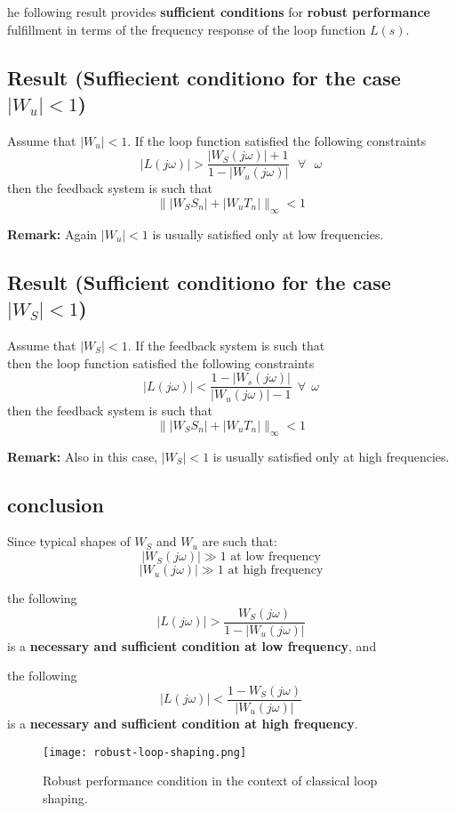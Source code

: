 he following result provides \textbf{sufficient conditions} for \textbf{robust performance} fulfillment in terms of the frequency response of the loop function $L(s)$.\\


\subsection{Result (Suffiecient conditiono for the case $|W_u|< 1$)}

Assume that $|W_u| < 1$. If the loop function satisfied the following constraints
\[
|L(j\omega)|> \frac{|W_S(j\omega)|+1}{1-|W_u(j\omega)|} \:\:\: \forall \:\:\: \omega
\]
then the feedback system is such that 
\[
\||W_SS_n|+|W_uT_n|\|_\infty < 1
\]

\textbf{Remark:} Again $|W_u| < 1$ is usually satisfied only at low frequencies.\\


\subsection{Result (Sufficient conditiono for the case $|W_S|< 1$)}
Assume that $|W_S|<1$. If the feedback system is such that \\
then the loop function satisfied the following constraints
\[
|L(j\omega)| < \frac{1-|W_s(j\omega)|}{|W_u(j\omega)|-1} \:\:\forall \:\: \omega
\]
then the feedback system is such that 
\[
\||W_SS_n|+|W_uT_n|\|_\infty < 1
\]

\textbf{Remark:} Also in this case, $|W_S| < 1$ is usually satisfied only at high frequencies.\\

\subsection{conclusion}
Since typical shapes of $W_S$ and $W_u$ are such that:
\[
|W_S(j\omega)| \gg 1  \text{  at low frequency}
\]
\[
|W_u(j\omega)| \gg 1  \text{  at high frequency}
\]

the following 
\[
|L(j\omega)| > \frac{W_S(j\omega)}{1- |W_u(j\omega)|}
\]
is a \textbf{necessary and sufficient condition at low frequency}, and

the following 
\[
|L(j\omega)| < \frac{1- W_S(j\omega)}{|W_u(j\omega)|}
\]
is a \textbf{necessary and sufficient condition at high frequency}.

 \begin{figure}[H]
    \centering
    \texttt{[image: robust-loop-shaping.png]}
    \caption{Robust performance condition in the context of classical loop shaping.}
 \end{figure}

